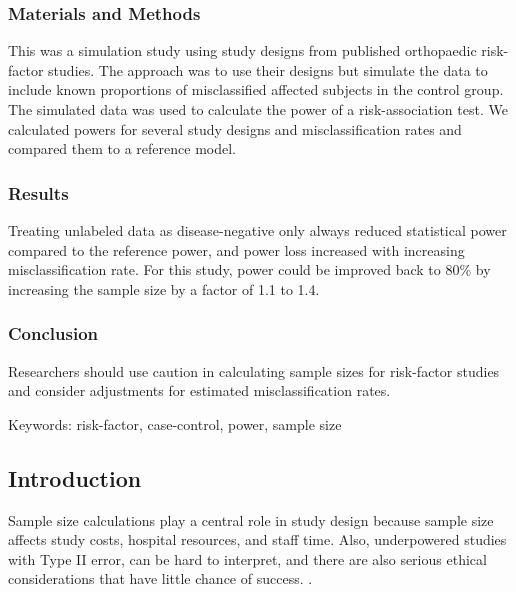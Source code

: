 \documentclass[
]{article}
\begin{document}
\hypertarget{materials-and-methods}{%
\subsubsection{Materials and Methods}\label{materials-and-methods}}

This was a simulation study using study designs from published
orthopaedic risk-factor studies. The approach was to use their designs
but simulate the data to include known proportions of misclassified
affected subjects in the control group. The simulated data was used to
calculate the power of a risk-association test. We calculated powers for
several study designs and misclassification rates and compared them to a
reference model.

\hypertarget{results}{%
\subsubsection{Results}\label{results}}

Treating unlabeled data as disease-negative only always reduced
statistical power compared to the reference power, and power loss
increased with increasing misclassification rate. For this study, power
could be improved back to 80\% by increasing the sample size by a factor
of 1.1 to 1.4.

\hypertarget{conclusion}{%
\subsubsection{Conclusion}\label{conclusion}}

Researchers should use caution in calculating sample sizes for
risk-factor studies and consider adjustments for estimated
misclassification rates.

Keywords: risk-factor, case-control, power, sample size

\newpage

\hypertarget{introduction}{%
\subsection{Introduction}\label{introduction}}

Sample size calculations play a central role in study design because
sample size affects study costs, hospital resources, and staff time.
Also, underpowered studies with Type II error, can be hard to interpret,
and there are also serious ethical considerations that have little
chance of success. \cite{ halpern2002continuing, hofmeister2007sample}.
\end{document}
